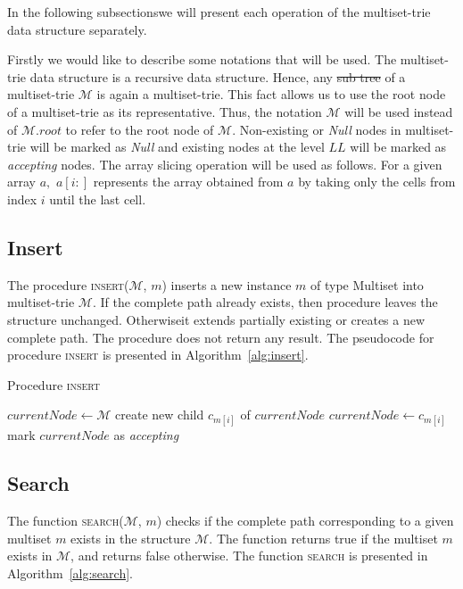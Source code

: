 \documentclass[10pt,letterpaper]{article}
\providecommand{\DIFaddtex}[1]{{\protect\color{blue}\uwave{#1}}} %
\providecommand{\DIFdeltex}[1]{{\protect\color{red}\sout{#1}}}                      %
\providecommand{\DIFaddbegin}{} %
\providecommand{\DIFaddend}{} %
\providecommand{\DIFdelbegin}{} %
\providecommand{\DIFdelend}{} %
\providecommand{\DIFadd}[1]{\texorpdfstring{\DIFaddtex{#1}}{#1}} %
\providecommand{\DIFdel}[1]{\texorpdfstring{\DIFdeltex{#1}}{}} %
\newcommand{\DIFscaledelfig}{0.5}
\newlength{\DIFdelgraphicswidth} %
\newlength{\DIFdelgraphicsheight} %
\newcommand{\DIFaddincludegraphics}[2][]{{\color{blue}\fbox{\DIFOincludegraphics[#1]{#2}}}} %
\newcommand{\DIFdelincludegraphics}[2][]{%
\sbox{\DIFdelgraphicsbox}{\DIFOincludegraphics[#1]{#2}}%
\settoboxwidth{\DIFdelgraphicswidth}{\DIFdelgraphicsbox} %
\settoboxtotalheight{\DIFdelgraphicsheight}{\DIFdelgraphicsbox} %
\scalebox{\DIFscaledelfig}{%
\parbox[b]{\DIFdelgraphicswidth}{\usebox{\DIFdelgraphicsbox}\\[-\baselineskip] \rule{\DIFdelgraphicswidth}{0em}}\llap{\resizebox{\DIFdelgraphicswidth}{\DIFdelgraphicsheight}{%
\setlength{\unitlength}{\DIFdelgraphicswidth}%
\begin{picture}(1,1)%
\thicklines\linethickness{2pt} %
{\color[rgb]{1,0,0}\put(0,0){\framebox(1,1){}}}%
{\color[rgb]{1,0,0}\put(0,0){\line( 1,1){1}}}%
{\color[rgb]{1,0,0}\put(0,1){\line(1,-1){1}}}%
\end{picture}%
}\hspace*{3pt}}} %
} %
\DeclareRobustCommand{\DIFaddbegin}{\DIFOaddbegin \let\includegraphics\DIFaddincludegraphics} %
\DeclareRobustCommand{\DIFaddend}{\DIFOaddend \let\includegraphics\DIFOincludegraphics} %
\DeclareRobustCommand{\DIFdelbegin}{\DIFOdelbegin \let\includegraphics\DIFdelincludegraphics} %
\DeclareRobustCommand{\DIFdelend}{\DIFOaddend \let\includegraphics\DIFOincludegraphics} %
\begin{document}
In the following subsections\DIFaddbegin \DIFadd{, }\DIFaddend we will present each operation of the multiset-trie 
data structure separately. 

Firstly we would like to describe some notations that will be used. The 
multiset-trie data structure is a recursive data structure. Hence, any \DIFdelbegin \DIFdel{sub 
tree }\DIFdelend \DIFaddbegin \DIFadd{subtree 
}\DIFaddend of a multiset-trie $\mathcal{M}$ is again a multiset-trie. This fact allows 
us to use the root node of a multiset-trie as its representative. Thus, the notation 
$\mathcal{M}$ will be used instead of $\mathcal{M}.root$ to refer to the root 
node of $\mathcal{M}.$ Non-existing or \emph{Null} nodes in multiset-trie will 
be marked as \emph{Null} and existing nodes at the level $LL$ will be marked 
as \emph{accepting} nodes. The array slicing operation will be used as follows. 
For a given array $a,$ $a[i:]$ represents the array obtained from $a$ by taking 
only the cells from index $i$ until the last cell. 


\subsection{Insert} \label{s:insert}
The procedure \textsc{insert}($\mathcal{M}$, $m$) inserts a new instance $m$ of 
type Multiset into multiset-trie $\mathcal{M}$. If the complete path already 
exists, then \DIFaddbegin \DIFadd{the }\DIFaddend procedure leaves the structure unchanged. Otherwise\DIFaddbegin \DIFadd{, }\DIFaddend it extends 
partially existing or creates a new complete path. The procedure does not return 
any result. The pseudocode for procedure \textsc{insert} is presented in 
Algorithm~\ref{alg:insert}.


\begin{algorithm}[h!]
\caption{Procedure \textsc{insert}}
\label{alg:insert}
\begin{algorithmic}[1]
\State $currentNode \gets \mathcal{M}$
\State create new child $c_{m[i]}$ of $currentNode$
\EndIf
\State $currentNode \gets c_{m[i]}$
\EndFor
\State mark $currentNode$ as \emph{accepting}
\EndProcedure
\end{algorithmic}
\end{algorithm}

\subsection{Search}\label{s:search}
The function \textsc{search}($\mathcal{M}$, $m$) checks if the complete path corresponding to 
a given multiset $m$ exists in the structure $\mathcal{M}.$ The function returns 
true if the multiset $m$ exists in $\mathcal{M}$, and returns false otherwise. The 
function \textsc{search} is presented in Algorithm~\ref{alg:search}.
\end{document}
